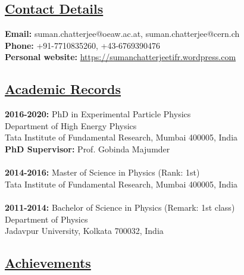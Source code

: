 \documentclass[a4paper,11pt]{article}
\begin{document}
\subsection*{\underline{Contact Details}}

\textbf{Email:} suman.chatterjee@oeaw.ac.at, suman.chatterjee@cern.ch\\
\textbf{Phone: } +91-7710835260, +43-6769390476\\
\textbf{Personal website: } \href{https://sumanchatterjeetifr.wordpress.com}{https://sumanchatterjeetifr.wordpress.com}


\subsection*{\underline{Academic Records}}

\textbf{2016-2020:}
PhD in Experimental Particle Physics\\
Department of High Energy Physics\\
Tata Institute of Fundamental Research, Mumbai 400005, India\\
\textbf{PhD Supervisor:} Prof. Gobinda Majumder\\
\\
\textbf{2014-2016:}
Master of Science in Physics (Rank: 1st)\\
Tata Institute of Fundamental Research, Mumbai 400005, India\\
\\
\textbf{2011-2014:}
Bachelor of Science in Physics (Remark: 1st class)\\
Department of Physics\\
Jadavpur University, Kolkata  700032, India\\

\subsection*{\underline{Achievements}}
\end{document}
